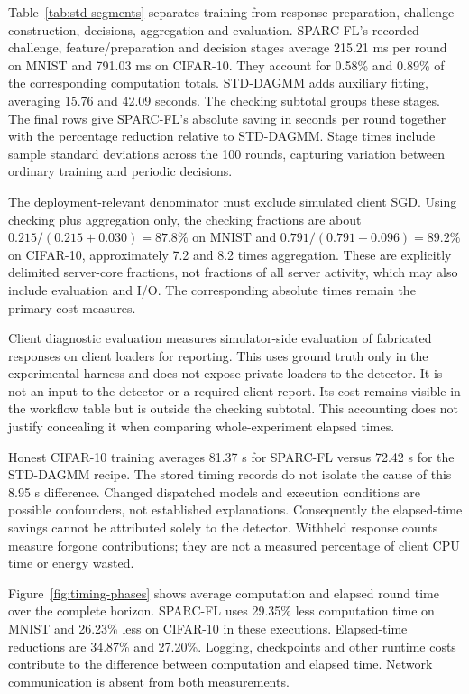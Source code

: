 \documentclass[journal]{IEEEtran}
\begin{document}
Table~\ref{tab:std-segments} separates training from response preparation,
challenge construction, decisions, aggregation and evaluation. SPARC-FL's
recorded challenge, feature/preparation and decision stages average
215.21 ms per round on MNIST and
791.03 ms on CIFAR-10. They account for 0.58\% and
0.89\% of the corresponding computation totals. STD-DAGMM adds auxiliary
fitting, averaging 15.76 and 42.09 seconds.
The checking subtotal groups these stages. The final rows give SPARC-FL's
absolute saving in seconds per round together with the percentage
reduction relative to STD-DAGMM. Stage times include sample standard
deviations across the 100 rounds, capturing variation between ordinary
training and periodic decisions.

The deployment-relevant denominator must exclude simulated client SGD.
Using checking plus aggregation only, the checking fractions are about
$0.215/(0.215+0.030)=87.8\%$ on MNIST and
$0.791/(0.791+0.096)=89.2\%$ on CIFAR-10, approximately 7.2 and 8.2 times
aggregation. These are explicitly delimited server-core fractions, not
fractions of all server activity, which may also include evaluation and
I/O. The corresponding absolute times remain the primary cost measures.

Client diagnostic evaluation measures simulator-side evaluation of fabricated
responses on client loaders for reporting. This uses ground truth only in the
experimental harness and does not expose private loaders to the detector.
It is not an input to the detector or a required
client report. Its cost remains visible in the workflow table but is
outside the checking subtotal. This accounting does not justify concealing
it when comparing whole-experiment elapsed times.

Honest CIFAR-10 training averages 81.37 s for SPARC-FL versus 72.42 s for
the STD-DAGMM recipe. The stored timing records do not isolate the cause
of this 8.95 s difference. Changed dispatched models and execution
conditions are possible confounders, not established explanations.
Consequently the elapsed-time savings cannot be attributed solely to the
detector. Withheld response counts measure forgone contributions; they
are not a measured percentage of client CPU time or energy wasted.

Figure~\ref{fig:timing-phases} shows average
computation and elapsed round time over the complete horizon. SPARC-FL uses
29.35\% less computation time on MNIST and
26.23\% less on CIFAR-10 in these executions. Elapsed-time
reductions are 34.87\% and
27.20\%. Logging, checkpoints and other runtime costs
contribute to the difference between computation and elapsed time. Network
communication is absent from both measurements.
\end{document}
